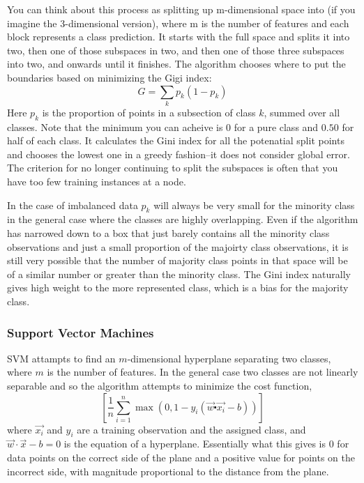 \documentclass{article}
\begin{document}
You can think about this process as splitting up m-dimensional space into  (if you imagine the 3-dimensional version), where m is the number of features and each block represents a class prediction. It starts with the full space and splits it into two, then one of those subspaces in two, and then one of those three subspaces into two, and onwards until it finishes.
The algorithm chooses where to put the boundaries based on minimizing the Gigi index:
\begin{equation}
G={\textstyle \sum_{k}p_{k}(1-p_{k})}
\end{equation}
Here $p_k$ is the proportion of points in a subsection of class $k$, summed over all classes.
Note that the minimum you can acheive is 0 for a pure class and $0.50$ for half of each class. It calculates the Gini index for all the potenatial split points and chooses the lowest one in a greedy fashion--it does not consider global error. The criterion for no longer continuing to split the subspaces is often that you have too few training instances at a node.

In the case of imbalanced data $p_k$ will always be very small for the minority class in the general case where the classes are highly overlapping. Even if the algorithm has narrowed down to a box that just barely contains all the minority class observations and just a small proportion of the majoirty class observations, it is still very possible that the number of majority class points in that space will be of a similar number or greater than the minority class. The Gini index naturally gives high weight to the more represented class, which is a bias for the majority class.

\subsubsection{Support Vector Machines}
SVM attampts to find an $m$-dimensional hyperplane separating two classes, where $m$ is the number of features.
In the general case two classes are not linearly separable and so the algorithm attempts to minimize the cost function,
\begin{equation}
	\left[\frac{1}{n}\sum_{i=1}^{n}\max(0,1-y_{i}(\overrightarrow{w}\centerdot\overrightarrow{x_{i}}-b))\right]
\end{equation}
where $\overrightarrow{x_{i}}$ and $y_{i}$ are a training observation and the assigned class, and $\vec{w} \cdot {\vec {x}}-b=0$ is the equation of a hyperplane. Essentially what this gives is 0 for data points on the correct side of the plane and a positive value for points on the incorrect side, with magnitude proportional to the distance from the plane.
\end{document}
